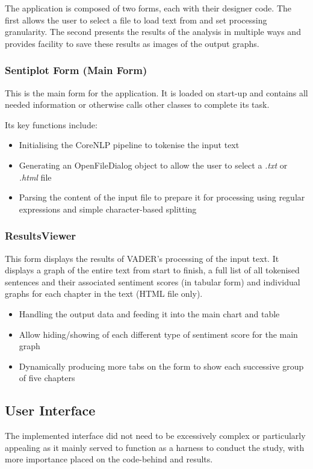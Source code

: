 \documentclass{article}
\begin{document}
{            The application is composed of two forms, each with their designer code. The first allows the user to select a file to load text from and set processing granularity. The second presents the results of the analysis in multiple ways and provides facility to save these results as images of the output graphs.
        \subsubsection{Sentiplot Form (Main Form)}
            This is the main form for the application. It is loaded on start-up and contains all needed information or otherwise calls other classes to complete its task.

            Its key functions include:
            \begin{itemize}
                \item Initialising the CoreNLP pipeline to tokenise the input text
                \item Generating an OpenFileDialog object to allow the user to select a \textit{.txt} or \textit{.html} file
                \item Parsing the content of the input file to prepare it for processing using regular expressions and simple character-based splitting
            \end{itemize}
        \subsubsection{ResultsViewer}
            This form displays the results of VADER's processing of the input text. It displays a graph of the entire text from start to finish, a full list of all tokenised sentences and their associated sentiment scores (in tabular form) and individual graphs for each chapter in the text (HTML file only).

            \begin{itemize}
                \item Handling the output data and feeding it into the main chart and table
                \item Allow hiding/showing of each different type of sentiment score for the main graph
                \item Dynamically producing more tabs on the form to show each successive group of five chapters
            \end{itemize}
    \subsection{User Interface}
        The implemented interface did not need to be excessively complex or particularly appealing as it mainly served to function as a harness to conduct the study, with more importance placed on the code-behind and results.

}
\end{document}
